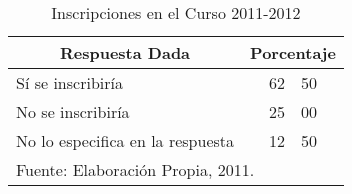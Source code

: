 \begin{table}[h!]
    \caption{Inscripciones en el Curso 2011-2012}
    \label{tbl:Encuesta:Inscripciones2011}
    \centering
    \begin{tabular}{l|r@{.}l@{\%}}
	    \multicolumn{1}{c|}{Respuesta Dada} &
	    	\multicolumn{2}{c}{Porcentaje} \\
	    \hline
	    \hline
	    Sí se inscribiría                  & 62 & 50 \\
	    No se inscribiría                  & 25 & 00 \\
	    No lo especifica en la respuesta   & 12 & 50 \\
	    \hline
	    \multicolumn{3}{l}{\footnotesize Fuente: Elaboración Propia, 2011.}
    \end{tabular}
\end{table}
